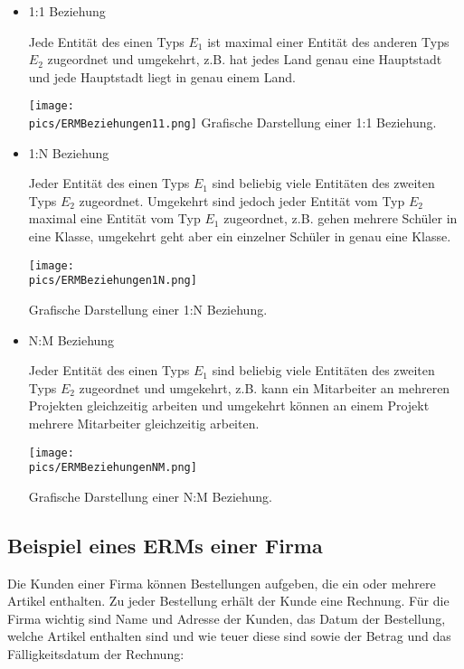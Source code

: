 \begin{itemize}
	\item 1:1 Beziehung

	Jede Entität des einen Typs \(E_1\) ist maximal einer Entität des anderen Typs \(E_2\) zugeordnet und umgekehrt, z.B. hat jedes Land genau eine Hauptstadt und jede Hauptstadt liegt in genau einem Land.
	\begin{minipage}{0.8\textwidth}
		\centering\texttt{[image: \\pics/ERMBeziehungen11.png]}
		Grafische Darstellung einer 1:1 Beziehung.
	\end{minipage}
	\item 1:N Beziehung

	Jeder Entität des einen Typs \(E_1\) sind beliebig viele Entitäten des zweiten Typs \(E_2\) zugeordnet. Umgekehrt sind jedoch jeder Entität vom Typ \(E_2\) maximal eine Entität vom Typ \(E_1\) zugeordnet, z.B. gehen mehrere Schüler in eine Klasse, umgekehrt geht aber ein einzelner Schüler in genau eine Klasse.

	\begin{minipage}{0.8\textwidth}
		\centering\texttt{[image: \\pics/ERMBeziehungen1N.png]}

		Grafische Darstellung einer 1:N Beziehung.
	\end{minipage}
	\item N:M Beziehung

	Jeder Entität des einen Typs \(E_1\) sind beliebig viele Entitäten des zweiten Typs \(E_2\) zugeordnet und umgekehrt, z.B. kann ein Mitarbeiter an mehreren Projekten gleichzeitig arbeiten und umgekehrt können an einem Projekt mehrere Mitarbeiter gleichzeitig arbeiten.

	\begin{minipage}{0.8\textwidth}
		\centering\texttt{[image: \\pics/ERMBeziehungenNM.png]}

		Grafische Darstellung einer N:M Beziehung.
	\end{minipage}
\end{itemize}

\subsection{Beispiel eines ERMs einer Firma}
Die Kunden einer Firma können Bestellungen aufgeben, die ein oder mehrere Artikel enthalten. Zu jeder Bestellung erhält der Kunde eine Rechnung. Für die Firma wichtig sind Name und Adresse der Kunden, das Datum der Bestellung, welche Artikel enthalten sind und wie teuer diese sind sowie der Betrag und das Fälligkeitsdatum der Rechnung:

